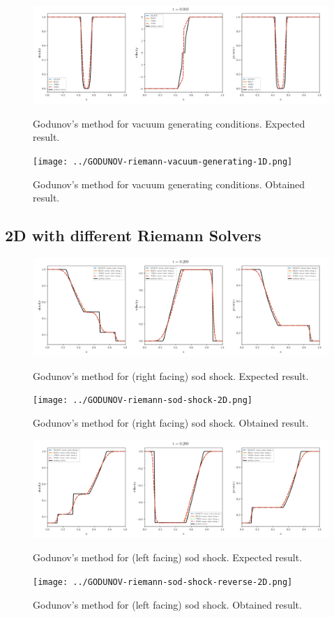 \begin{figure}[htbp]
    \centering
	\includegraphics[width=.9\textwidth]{./figures/GODUNOV-riemann-vacuum-generating-1D.png}%
	\caption{Godunov's method for vacuum generating conditions. Expected result.}
	\texttt{[image: ../GODUNOV-riemann-vacuum-generating-1D.png]}%
	\caption{Godunov's method for vacuum generating conditions. Obtained result.}
\end{figure}








\subsection{2D with different Riemann Solvers}

\begin{figure}[htbp]
    \centering
	\includegraphics[width=.9\textwidth]{./figures/GODUNOV-riemann-sod-shock-2D.png}%
	\caption{Godunov's method for (right facing) sod shock. Expected result.}
	\texttt{[image: ../GODUNOV-riemann-sod-shock-2D.png]}%
	\caption{Godunov's method for (right facing) sod shock. Obtained result.}
\end{figure}


\begin{figure}[htbp]
    \centering
	\includegraphics[width=.9\textwidth]{./figures/GODUNOV-riemann-sod-shock-reverse-2D.png}%
	\caption{Godunov's method for (left facing) sod shock. Expected result.}
	\texttt{[image: ../GODUNOV-riemann-sod-shock-reverse-2D.png]}%
	\caption{Godunov's method for (left facing) sod shock. Obtained result.}
\end{figure}










